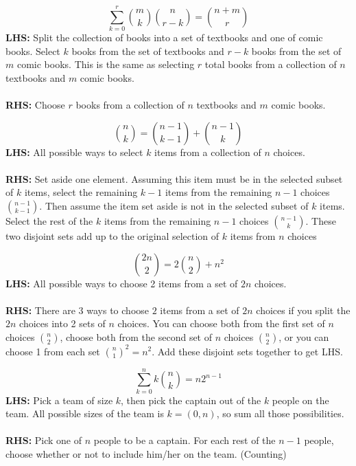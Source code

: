 \documentclass{article}\usepackage{amsmath,amssymb,amsthm,tikz,tkz-graph,color,chngpage,soul,hyperref,csquotes,graphicx,floatrow, listings}\newcommand*{\QEDB}{\hfill\ensuremath{\square}}\newtheorem*{prop}{Proposition}\renewcommand{\theenumi}{\alph{enumi}}\usepackage[shortlabels]{enumitem}\usepackage[nobreak=true]{mdframed}\usetikzlibrary{matrix,calc}\MakeOuterQuote{"}\usepackage[margin=0.75in]{geometry} \newtheorem{theorem}{Theorem}\newcommand{\Z}{\mathbb Z}\newcommand{\R}{\mathbb R}\newcommand{\Q}{\mathbb Q}\newcommand{\N}{\mathbb N}\newcommand{\x}[1]{\textrm{ #1 }}\newcommand{\pr}{\textrm{Pr}}
\newcommand{\sumlim}[3]{\sum\limits_{#1}^{#2}#3}
\newcommand{\eq}[1]{\begin{equation}#1\end{equation}}
\begin{document}
\begin{mdframed}
\eq{\sumlim{k=0}{r}{\binom{m}{k}\binom{n}{r-k}}=\binom{n+m}{r}}
\textbf{LHS:} Split the collection of books into a set of textbooks and one of comic books. Select $k$ books from the set of textbooks and $r-k$ books from the set of $m$ comic books. This is the same as selecting $r$ total books from a collection of $n$ textbooks and $m$ comic books.\\\\
\textbf{RHS:} Choose $r$ books from a collection of $n$ textbooks and $m$ comic books.
\end{mdframed}
\begin{mdframed}
\eq{\binom{n}{k}=\binom{n-1}{k-1}+\binom{n-1}{k}}
\textbf{LHS:} All possible ways to select $k$ items from a collection of $n$ choices.\\\\
\textbf{RHS:} Set aside one element. Assuming this item must be in the selected subset of $k$ items, select the remaining $k-1$ items from the remaining $n-1$ choices $\binom{n-1}{k-1}$. Then assume the item set aside is not in the selected subset of $k$ items. Select the rest of the $k$ items from the remaining $n-1$ choices $\binom{n-1}{k}$. These two disjoint sets add up to the original selection of $k$ items from $n$ choices
\end{mdframed}
\begin{mdframed}
\eq{\binom{2n}{2}=2\binom{n}{2}+n^2}
\textbf{LHS:} All possible ways to choose 2 items from a set of $2n$ choices.\\\\
\textbf{RHS:} There are 3 ways to choose $2$ items from a set of $2n$ choices if you split the $2n$ choices into 2 sets of $n$ choices. You can choose both from the first set of $n$ choices $\binom{n}{2}$, choose both from the second set of $n$ choices $\binom{n}{2}$, or you can choose 1 from each set $\binom{n}{1}^2=n^2$. Add these disjoint sets together to get LHS.
\end{mdframed}
\begin{mdframed}
\eq{\sumlim{k=0}{n}k\binom{n}{k}=n2^{n-1}}
\textbf{LHS:} Pick a team of size $k$, then pick the captain out of the $k$ people on the team. All possible sizes of the team is $k=(0,n)$, so sum all those possibilities.\\\\
\textbf{RHS:} Pick one of $n$ people to be a captain. For each rest of the $n-1$ people, choose whether or not to include him/her on the team. (Counting)
\end{mdframed}
\end{document}
